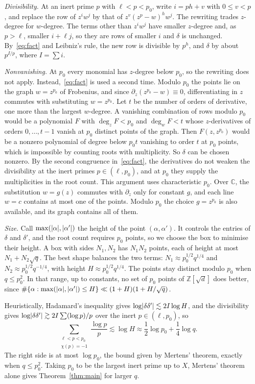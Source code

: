 \documentclass[11pt]{amsart}
\theoremstyle{remark}
\newcommand{\Z}{\mathbb{Z}}
\newcommand{\sd}{\sqrt{d}}
\newcommand{\C}{\mathbb{C}}
\DeclarePairedDelimiter\abs{\lvert}{\rvert}
\begin{document}
\emph{Divisibility.} At an inert prime $p$ with $\ell<p<p_0$, write $i=ph+v$ with $0\le v<p$, and
replace the row of $z^iw^j$ by that of $z^v(z^p-w)^hw^j$. The rewriting trades $z$-degree for $w$-degree. The
terms other than $z^iw^j$ have smaller $z$-degree and, as $p>\ell$, smaller $i+\ell j$, so they are rows of smaller $i$
and $\delta$ is unchanged. By~\eqref{eq:fact} and
Leibniz's rule, the new row is divisible by $p^h$, and $\delta$ by about $p^{I/p}$,
where $I=\sum i$.

\emph{Nonvanishing.} At $p_0$ every monomial has $z$-degree below $p_0$, so the rewriting does not apply.
Instead,~\eqref{eq:fact} is used a second time. Modulo $p_0$ the points lie on the graph $w=z^{p_0}$
of Frobenius, and since $\partial_z(z^{p_0}-w)\equiv0$, differentiating in $z$ commutes with
substituting $w=z^{p_0}$. Let $t$ be the number of orders of derivative, one more than the
largest $w$-degree. A vanishing combination of rows modulo $p_0$ would be a polynomial $F$ with
$\deg_zF<p_0$ and $\deg_wF<t$ whose $z$-derivatives of orders $0,\dots,t-1$
vanish at $p_0$ distinct points of the graph. Then $F(z,z^{p_0})$ would be a nonzero polynomial of
degree below $p_0t$ vanishing to order $t$ at $p_0$ points, which is impossible by counting
roots with multiplicity. So $\delta$ can be chosen nonzero. By the second congruence in~\eqref{eq:fact}, the
derivatives do not weaken the divisibility at the inert primes $p\in(\ell,p_0)$, and at $p_0$ they
supply the multiplicities in the root count. This argument uses characteristic $p_0$. Over $\C$, the
substitution $w=g(z)$ commutes with $\partial_z$ only for constant $g$, and each line $w=c$ contains at
most one of the points. Modulo $p_0$ the choice $g=z^{p_0}$ is also available, and its graph contains
all of them.

\emph{Size.} Call $\max(\abs{\alpha},\abs{\alpha'})$ the height of the point $(\alpha,\alpha')$. It
controls the entries of $\delta$ and $\delta'$, and the root count requires $p_0$ points, so we choose the
box to minimise their height. A box with sides $N_1,N_2$ has $N_1N_2$ points, each of height at most
$N_1+N_2\sqrt q$. The best shape balances the two terms: $N_1\approx p_0^{1/2}q^{1/4}$ and
$N_2\approx p_0^{1/2}q^{-1/4}$, with height $H\approx p_0^{1/2}q^{1/4}$. The points stay distinct modulo
$p_0$ when $q\le p_0^2$. In that range,
up to constants, no set of $p_0$ points of $\Z[\sd]$ does better, since
$\#\{\alpha:\max(\abs{\alpha},\abs{\alpha'})\le H\}\ll(1+H)(1+H/\sqrt q)$.

Heuristically, Hadamard's inequality gives $\log\abs{\delta\delta'}\lesssim2I\log H$, and the
divisibility gives $\log\abs{\delta\delta'}\gtrsim2I\sum(\log p)/p$ over the inert $p\in(\ell,p_0)$, so
\[
\sum_{\substack{\ell<p<p_0\\ \chi(p)=-1}}\frac{\log p}p\lesssim\log H\approx\frac12\log p_0+\frac14\log q.
\]
The right side is at most $\log p_0$, the bound given by Mertens' theorem, exactly when $q\le p_0^2$.
Taking $p_0$ to be the largest inert prime up to $X$, Mertens' theorem alone gives Theorem~\ref{thm:main} for larger $q$.
\end{document}
